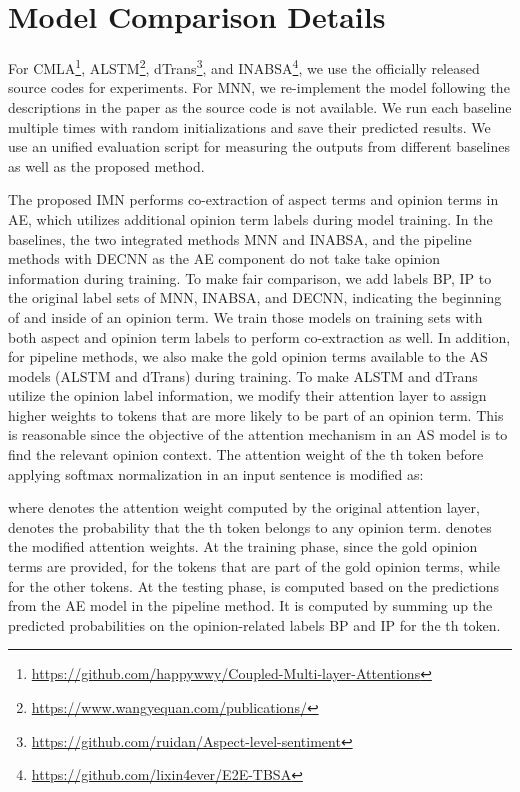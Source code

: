 \documentclass[11pt,a4paper]{article}
\begin{document}
\section{Model Comparison Details}
\label{model_comparison}
For CMLA\footnote{\url{https://github.com/happywwy/Coupled-Multi-layer-Attentions}},  ALSTM\footnote{\url{https://www.wangyequan.com/publications/}}, dTrans\footnote{\url{https://github.com/ruidan/Aspect-level-sentiment}}, and INABSA\footnote{\url{https://github.com/lixin4ever/E2E-TBSA}}, we use the officially released source codes for experiments. For MNN, we re-implement the model following the descriptions in the paper as the source code is not available. We run each baseline multiple times with random initializations and save their predicted results. We use an unified evaluation script for measuring the outputs from different baselines as well as the proposed method.

The proposed IMN performs co-extraction of aspect terms and opinion terms in AE, which utilizes additional opinion term labels during model training. In the baselines, the two integrated methods MNN and INABSA, and the pipeline methods with DECNN as the AE component do not take take opinion information during training. To make fair comparison, we add labels BP, IP to the original label sets of MNN, INABSA, and DECNN, indicating the beginning of and inside of an opinion term. We train those models on training sets with both aspect and opinion term labels to perform co-extraction as well. In addition, for pipeline methods, we also make the gold opinion terms available to the AS models (ALSTM and dTrans) during training. To make ALSTM and dTrans utilize the opinion label information, we modify their attention layer to assign higher weights to tokens that are more likely to be part of an opinion term. This is reasonable since the objective of the attention mechanism in an AS model is to find the relevant opinion context.  The attention weight of the th token before applying softmax normalization in an input sentence is modified as:

where  denotes the attention weight computed by the original attention layer,  denotes the probability that the th token belongs to any opinion term.  denotes the modified attention weights. At the training phase, since the gold opinion terms are provided,  for the tokens that are part of the gold opinion terms, while  for the other tokens. At the testing phase,  is computed based on the predictions from the AE model in the pipeline method. It is computed by summing up the predicted probabilities on the opinion-related labels BP and IP for the th token.
\end{document}
